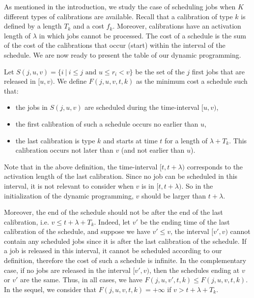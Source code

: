 As mentioned in the introduction, we study the case of scheduling jobs when $K$ different types of calibrations are available. Recall that a calibration of type $k$ is defined by a length $T_k$ and a cost $f_k$. Moreover, calibrations have an activation length of $\lambda$ in which jobs cannot be processed. The cost of a schedule is the sum of the cost of the calibrations that occur (start) within the interval of the schedule.
We are now ready to present the table of our dynamic programming. 

\begin{definition} Let $S(j,u,v)=\{ i~|~ i\leq j \mbox{ and } u \leq r_i <v \}$ be the set of the $j$ first jobs that are released in $[u,v)$.
We define $F(j,u,v,t,k)$ as the minimum cost a schedule such that:
\begin{itemize}
\item the jobs in $S(j,u,v)$ are scheduled during the time-interval $[u,v)$,
\item the first calibration of such a schedule occurs no earlier than $u$,
\item the last calibration is type $k$ and starts at time $t$ for a length of $\lambda+T_k$. This calibration occurs not later than $v$ (and not earlier than $u$).
\end{itemize}
\end{definition}

Note that in the above definition, the time-interval $[t,t+\lambda)$ corresponds to the activation length of the last calibration. Since no job can be scheduled in this interval, it is not relevant to consider when $v$ is in $[t,t+\lambda)$. So in the initialization of the dynamic programming, $v$ should be larger than $t+\lambda$.

Moreover, the end of the schedule should not be after the end of the last calibration, i.e. $v\leq t+\lambda+T_k$. Indeed, let $v'$ be the ending time of the last calibration of the schedule, and suppose we have $v'\leq v$, the interval $[v',v)$ cannot contain any scheduled jobs since it is after the last calibration of the schedule. If a job is released in this interval, it cannot be scheduled according to our definition, therefore the cost of such a schedule is infinite. In the complementary case, if no jobs are released in the interval $[v',v)$, then the schedules ending at $v$ or $v'$ are the same. Thus, in all cases, we have $F(j,u,v',t,k)\leq F(j,u,v,t,k)$.
In the sequel, we consider that $F(j,u,v,t,k)=+\infty$ if $v>t+\lambda + T_k$.

